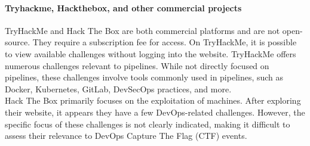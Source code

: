 \paragraph{Tryhackme, Hackthebox, and other commercial projects}
\label{par:tryhackme-hackthebox}
TryHackMe and Hack The Box are both commercial platforms and are not open-source. They require a subscription fee for access.
On TryHackMe\cite{tryhackme}, it is possible to view available challenges without logging into the website. 
TryHackMe offers numerous challenges relevant to pipelines. While not directly focused on pipelines, 
these challenges involve tools commonly used in pipelines, such as Docker, Kubernetes, GitLab, DevSecOps practices, and more.\\
Hack The Box\cite{hackthebox} primarily focuses on the exploitation of machines. After exploring their website, it appears they have a few 
DevOps-related challenges. However, 
the specific focus of these challenges is not clearly indicated, making it difficult to assess their relevance to DevOps Capture The Flag (CTF) events.


